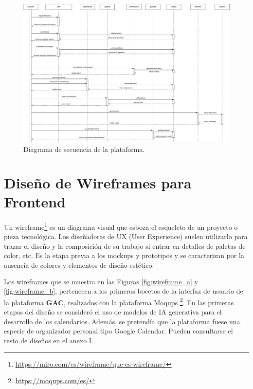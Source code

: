 \begin{landscape}
    \begin{figure}[H]
        \centering
        \includegraphics[width=1.35\textwidth]{./imagenes/Secuencia_Diagrama.png}
        \caption{Diagrama de secuencia de la plataforma.}
        \label{fig:sequence_diagram}
    \end{figure}    
\end{landscape}

\section{Diseño de Wireframes para Frontend}

Un wireframe\footnote{\url{https://miro.com/es/wireframe/que-es-wireframe/}} es un diagrama visual que esboza el esqueleto de un proyecto o pieza tecnológica. Los diseñadores de UX (User Experience) suelen utilizarlo para trazar el diseño y la composición de su trabajo si entrar en detalles de paletas de color, etc. Es la etapa previa a los mockups y prototipos y se caracterizan por la ausencia de colores y elementos de diseño estético.\newline

Los wireframes que se muestra en las Figuras \ref{fig:wireframe_a} y \ref{fig:wireframe_b}, pertenecen a los primeros bocetos de la interfaz de usuario de la plataforma \textbf{GAC}, realizados con la plataforma Moqups \footnote{\url{https://moqups.com/es/}}. En las primeras etapas del diseño se consideró el uso de modelos de IA generativa para el desarrollo de los calendarios. Además, se pretendía que la plataforma fuese una especie de organizador personal tipo Google Calendar. Pueden consultarse el resto de diseños en el anexo I.\newline


